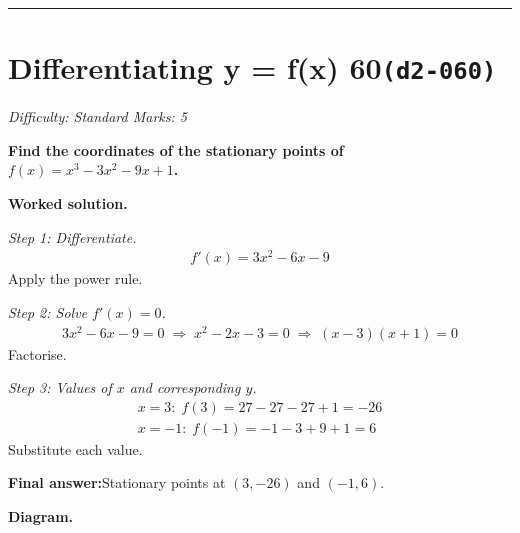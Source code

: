 \documentclass[11pt]{article}
\newcommand{\question}[1]{\par\medskip\noindent\textbf{#1}\par}
\begin{document}
\medskip\hrule

\section*{Differentiating y = f(x) 60\quad\small\texttt{(d2-060)}}
\textit{Difficulty: Standard \quad\textbar\quad Marks: 5}

\question{Find the coordinates of the stationary points of \( f(x) = x^3 - 3x^2 - 9x + 1 \).}

\textbf{Worked solution.}

\textit{Step 1: Differentiate.}
\[\begin{gathered}
f'(x) = 3x^2 - 6x - 9
\end{gathered}\]
Apply the power rule.

\textit{Step 2: Solve \( f'(x) = 0 \).}
\[\begin{gathered}
3x^2 - 6x - 9 = 0 \;\Rightarrow\; x^2 - 2x - 3 = 0 \;\Rightarrow\; (x-3)(x+1) = 0
\end{gathered}\]
Factorise.

\textit{Step 3: Values of \( x \) and corresponding \( y \).}
\[\begin{gathered}
x = 3: \; f(3) = 27 - 27 - 27 + 1 = -26 \\ x = -1: \; f(-1) = -1 - 3 + 9 + 1 = 6
\end{gathered}\]
Substitute each value.

\begin{answerbox}
\textbf{Final answer:}\quad Stationary points at \(\displaystyle  (3, -26) \) and \(\displaystyle  (-1, 6) \).
\end{answerbox}
\textbf{Diagram.}
\end{document}
